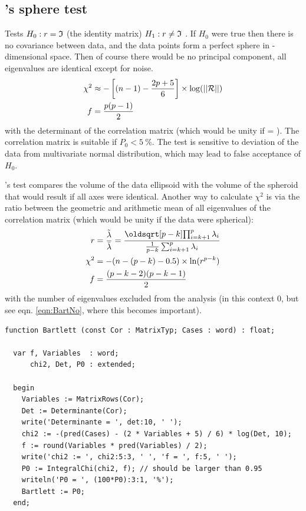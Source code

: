 \begin{refsection}
\subsection{'s sphere test}

Tests \(H_0: r = \mathfrak{I} \) (the identity matrix)  \(H_1: r \neq \mathfrak{I} \)  \parencite{Bar-51}. If \(H_0 \) were true then there is no covariance between data, and the data points form a perfect sphere in -dimensional space. Then of course there would be no principal component, all eigenvalues are identical except for noise.
\begin{align}
  \chi^2 &\approx -\left[(n-1)-\frac{2p+5}{6}\right] \times \log(||\mathcal{R}||) \\
  f      &= \frac{p(p-1)}{2}
\end{align}
with  the determinant of the correlation matrix (which would be unity if  =
). The correlation matrix is suitable if \(P_0 < \SI{5}{\%} \). The test is sensitive to deviation of the
data from multivariate normal distribution, which may lead to false acceptance of \(H_0 \).

's test compares the volume of the data ellipsoid with the volume of the spheroid that would result if all axes were identical.  Another way to calculate \(\chi^2 \) is via the ratio between the geometric and arithmetic mean of all eigenvalues of the correlation matrix (which would be unity if the data were spherical):
\begin{align} \label{eqn:Bart}
  r      &= \frac{\tilde{\lambda}}{\bar{\lambda}} = \frac{\sqrt[p-k]{\prod_{i=k+1}^{p}{\lambda_i}}}{\frac{1}{p-k} \sum_{i=k+1}^{p}{\lambda_i}} \\
  \chi^2 &= -(n - (p-k) - 0.5) \times \ln(r^{p-k}) \notag \\
  f      &= \frac{(p - k - 2)(p - k - 1)}{2} \notag
\end{align}
with  the number of eigenvalues excluded from the analysis (in this context 0, but see eqn. \ref{eqn:BartNo}, where this becomes important).

\begin{lstlisting}[caption=\Name{Bartlett}'s sphere test]
  function Bartlett (const Cor : MatrixTyp; Cases : word) : float;

  var f, Variables  : word;
      chi2, Det, P0 : extended;

  begin
    Variables := MatrixRows(Cor);
    Det := Determinante(Cor);
    write('Determinante = ', det:10, ' ');
    chi2 := -(pred(Cases) - (2 * Variables + 5) / 6) * log(Det, 10);
    f := round(Variables * pred(Variables) / 2);
    write('chi2 := ', chi2:5:3, ' ', 'f = ', f:5, ' ');
    P0 := IntegralChi(chi2, f); // should be larger than 0.95
    writeln('P0 = ', (100*P0):3:1, '%');
    Bartlett := P0;
  end;
\end{lstlisting}


\end{refsection}
